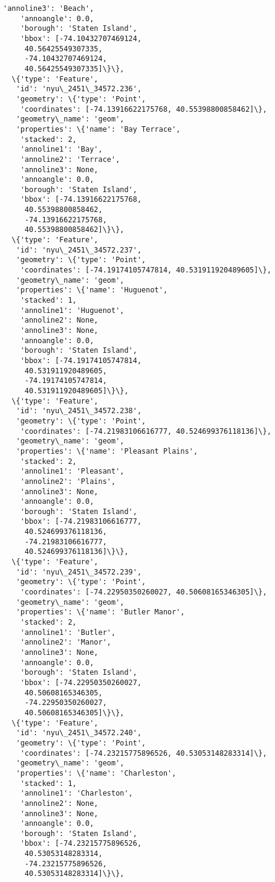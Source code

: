 \documentclass[11pt]{article}
\begin{document}
\begin{tcolorbox}[breakable, size=fbox, boxrule=.5pt, pad at break*=1mm, opacityfill=0]
\begin{Verbatim}[commandchars=\\\{\}]
    'annoline3': 'Beach',
    'annoangle': 0.0,
    'borough': 'Staten Island',
    'bbox': [-74.10432707469124,
     40.56425549307335,
     -74.10432707469124,
     40.56425549307335]\}\},
  \{'type': 'Feature',
   'id': 'nyu\_2451\_34572.236',
   'geometry': \{'type': 'Point',
    'coordinates': [-74.13916622175768, 40.55398800858462]\},
   'geometry\_name': 'geom',
   'properties': \{'name': 'Bay Terrace',
    'stacked': 2,
    'annoline1': 'Bay',
    'annoline2': 'Terrace',
    'annoline3': None,
    'annoangle': 0.0,
    'borough': 'Staten Island',
    'bbox': [-74.13916622175768,
     40.55398800858462,
     -74.13916622175768,
     40.55398800858462]\}\},
  \{'type': 'Feature',
   'id': 'nyu\_2451\_34572.237',
   'geometry': \{'type': 'Point',
    'coordinates': [-74.19174105747814, 40.531911920489605]\},
   'geometry\_name': 'geom',
   'properties': \{'name': 'Huguenot',
    'stacked': 1,
    'annoline1': 'Huguenot',
    'annoline2': None,
    'annoline3': None,
    'annoangle': 0.0,
    'borough': 'Staten Island',
    'bbox': [-74.19174105747814,
     40.531911920489605,
     -74.19174105747814,
     40.531911920489605]\}\},
  \{'type': 'Feature',
   'id': 'nyu\_2451\_34572.238',
   'geometry': \{'type': 'Point',
    'coordinates': [-74.21983106616777, 40.524699376118136]\},
   'geometry\_name': 'geom',
   'properties': \{'name': 'Pleasant Plains',
    'stacked': 2,
    'annoline1': 'Pleasant',
    'annoline2': 'Plains',
    'annoline3': None,
    'annoangle': 0.0,
    'borough': 'Staten Island',
    'bbox': [-74.21983106616777,
     40.524699376118136,
     -74.21983106616777,
     40.524699376118136]\}\},
  \{'type': 'Feature',
   'id': 'nyu\_2451\_34572.239',
   'geometry': \{'type': 'Point',
    'coordinates': [-74.22950350260027, 40.50608165346305]\},
   'geometry\_name': 'geom',
   'properties': \{'name': 'Butler Manor',
    'stacked': 2,
    'annoline1': 'Butler',
    'annoline2': 'Manor',
    'annoline3': None,
    'annoangle': 0.0,
    'borough': 'Staten Island',
    'bbox': [-74.22950350260027,
     40.50608165346305,
     -74.22950350260027,
     40.50608165346305]\}\},
  \{'type': 'Feature',
   'id': 'nyu\_2451\_34572.240',
   'geometry': \{'type': 'Point',
    'coordinates': [-74.23215775896526, 40.53053148283314]\},
   'geometry\_name': 'geom',
   'properties': \{'name': 'Charleston',
    'stacked': 1,
    'annoline1': 'Charleston',
    'annoline2': None,
    'annoline3': None,
    'annoangle': 0.0,
    'borough': 'Staten Island',
    'bbox': [-74.23215775896526,
     40.53053148283314,
     -74.23215775896526,
     40.53053148283314]\}\},

\end{Verbatim}
\end{tcolorbox}
\end{document}

